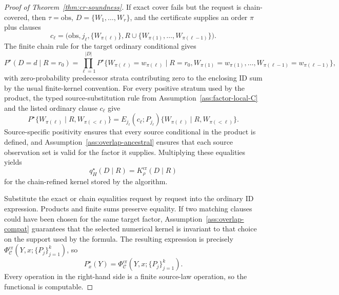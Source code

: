 \documentclass[11pt]{article}
\theoremstyle{definition}
\theoremstyle{plain}
\theoremstyle{remark}
\begin{document}
\begin{proof}[Proof of Theorem~\ref{thm:cr-soundness}]
If exact cover fails but the request is chain-covered, then
\(\tau=\mathrm{obs}\), \(D=\{W_1,\ldots,W_r\}\), and the certificate supplies
an order \(\pi\) plus clauses
\[
  c_\ell=
  \bigl(\mathrm{obs},j_\ell,\{W_{\pi(\ell)}\},
        R\cup\{W_{\pi(1)},\ldots,W_{\pi(\ell-1)}\}\bigr).
\]
The finite chain rule for the target ordinary conditional gives
\[
  P^\star(D=d\mid R=r_0)
  =
  \prod_{\ell=1}^{|D|}
  P^\star\{W_{\pi(\ell)}=w_{\pi(\ell)}
    \mid R=r_0,W_{\pi(1)}=w_{\pi(1)},\ldots,
          W_{\pi(\ell-1)}=w_{\pi(\ell-1)}\},
\]
with zero-probability predecessor strata contributing zero to the enclosing
ID sum by the usual finite-kernel convention.  For every positive stratum
used by the product, the typed source-substitution rule from
Assumption~\ref{ass:factor-local-C} and the listed ordinary clause
\(c_\ell\) give
\[
  P^\star\{W_{\pi(\ell)}\mid R,W_{\pi(<\ell)}\}
  =
  E_{j_\ell}(c_\ell;P_{j_\ell})
  \{W_{\pi(\ell)}\mid R,W_{\pi(<\ell)}\}.
\]
Source-specific positivity ensures that every source conditional in the
product is defined, and Assumption~\ref{ass:overlap-ancestral} ensures that
each source observation set is valid for the factor it supplies.  Multiplying
these equalities yields
\[
  q^\star_H(D\mid R)=K^{\mathrm{cr}}_\rho(D\mid R)
\]
for the chain-refined kernel stored by the algorithm.

Substitute the exact or chain equalities request by request into the ordinary
ID expression.  Products and finite sums preserve equality.  If two matching
clauses could have been chosen for the same target factor, Assumption~\ref{ass:overlap-compat}
guarantees that the selected numerical kernel is invariant to that choice on
the support used by the formula.  The resulting expression is precisely
\(\Phi^{\mathrm{cr}}_{\mathcal C}(Y,x;\{P_j\}_{j=1}^k)\), so
\[
  P^\star_x(Y)=
  \Phi^{\mathrm{cr}}_{\mathcal C}(Y,x;\{P_j\}_{j=1}^k).
\]
Every operation in the right-hand side is a finite source-law operation, so
the functional is computable.
\end{proof}
\end{document}
